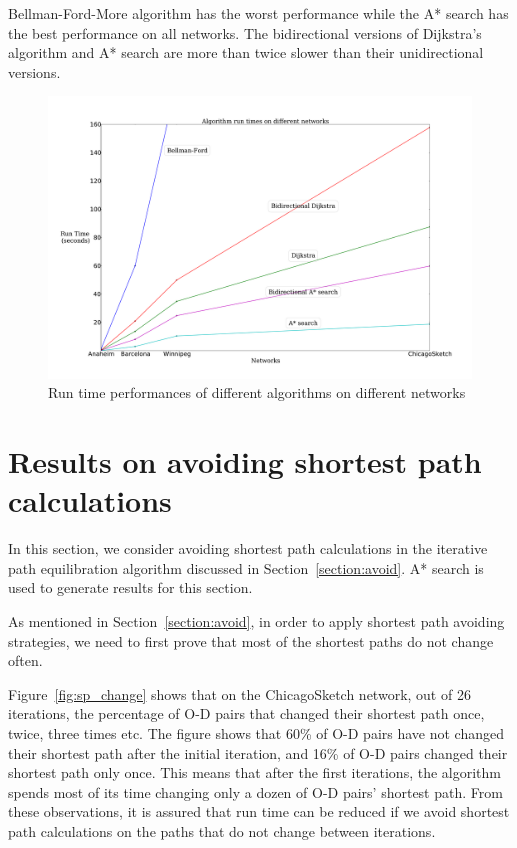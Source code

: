 Bellman-Ford-More algorithm has the worst performance while the A* search has the best performance on all networks.
The bidirectional versions of Dijkstra's algorithm and A* search are more than twice slower than their unidirectional versions.

\begin{figure}[H]
    \centering
    \includegraphics[width=\textwidth]{img/runtime}
    \caption{Run time performances of different algorithms on different networks}
    \label{fig:allresults}
\end{figure}


\section{Results on avoiding shortest path calculations}
In this section, we consider avoiding shortest path calculations in the iterative path equilibration algorithm discussed in Section~\ref{section:avoid}.
A* search is used to generate results for this section.

As mentioned in Section~\ref{section:avoid},
in order to apply shortest path avoiding strategies,
we need to first prove that most of the shortest paths do not change often.

Figure~\ref{fig:sp_change} shows that on the ChicagoSketch network,
out of 26 iterations,
the percentage of O-D pairs that changed their shortest path once, twice, three times etc.
The figure shows that 60\% of O-D pairs have not changed their shortest path after the initial iteration,
and 16\% of O-D pairs changed their shortest path only once.
This means that after the first iterations,
the algorithm spends most of its time changing only a dozen of O-D pairs' shortest path.
From these observations,
it is assured that run time can be reduced if we avoid shortest path calculations on the paths that do not change between iterations.

